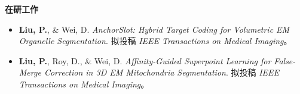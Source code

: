 {\large\bfseries\sffamily 在研工作\par}
\begin{itemize}
\item \textbf{Liu, P.}, \& Wei, D. \textit{AnchorSlot: Hybrid Target Coding for Volumetric EM Organelle Segmentation}. 拟投稿 \textit{IEEE Transactions on Medical Imaging}。
\item \textbf{Liu, P.}, Roy, D., \& Wei, D. \textit{Affinity-Guided Superpoint Learning for False-Merge Correction in 3D EM Mitochondria Segmentation}. 拟投稿 \textit{IEEE Transactions on Medical Imaging}。
\end{itemize}
